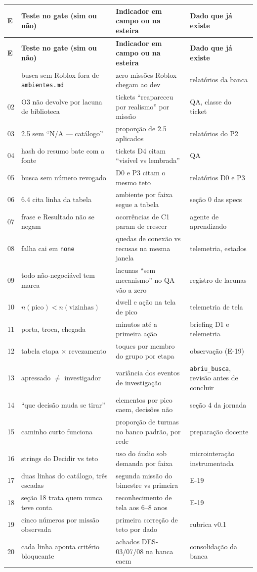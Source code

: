 \documentclass[11pt,a4paper]{article}
\begin{document}
\begin{longtable}{@{}p{0.9cm} p{4.6cm} p{4.6cm} p{4.4cm}@{}}
\toprule
\textbf{E} & \textbf{Teste no gate (sim ou não)} & \textbf{Indicador em campo ou na esteira} & \textbf{Dado que já existe} \\
\midrule
\endfirsthead
\toprule
\textbf{E} & \textbf{Teste no gate (sim ou não)} & \textbf{Indicador em campo ou na esteira} & \textbf{Dado que já existe} \\
\midrule
\endhead
\bottomrule
\endfoot
01 & busca sem Roblox fora de \texttt{ambientes.md} & zero missões Roblox chegam ao dev & relatórios da banca \\
02 & O3 não devolve por lacuna de biblioteca & tickets ``reapareceu por realismo'' por missão & QA, classe do ticket \\
03 & 2.5 sem ``N/A --- catálogo'' & proporção de 2.5 aplicados & relatórios do P2 \\
04 & hash do resumo bate com a fonte & tickets D4 citam ``visível vs lembrada'' & QA \\
05 & busca sem número revogado & D0 e P3 citam o mesmo teto & relatórios D0 e P3 \\
06 & 6.4 cita linha da tabela & ambiente por faixa segue a tabela & seção 0 das specs \\
07 & frase e Resultado não se negam & ocorrências de C1 param de crescer & agente de aprendizado \\
08 & falha cai em \texttt{none} & quedas de conexão vs recusas na mesma janela & telemetria, estados \\
09 & todo não-negociável tem marca & lacunas ``sem mecanismo'' no QA vão a zero & registro de lacunas \\
10 & $n(\text{pico}) < n(\text{vizinhas})$ & dwell e ação na tela de pico & telemetria de tela \\
11 & porta, troca, chegada & minutos até a primeira ação & briefing D1 e telemetria \\
12 & tabela etapa $\times$ revezamento & toques por membro do grupo por etapa & observação (E-19) \\
13 & apressado $\ne$ investigador & variância dos eventos de investigação & \texttt{abriu\_busca}, revisão antes de concluir \\
14 & ``que decisão muda se tirar'' & elementos por pico caem, decisões não & seção 4 da jornada \\
15 & caminho curto funciona & proporção de turmas no banco padrão, por rede & preparação docente \\
16 & strings do Decidir vs teto & uso do áudio sob demanda por faixa & microinteração instrumentada \\
17 & duas linhas do catálogo, três escadas & segunda missão do bimestre vs primeira & E-19 \\
18 & seção 18 trata quem nunca teve conta & reconhecimento de tela aos 6--8 anos & E-19 \\
19 & cinco números por missão observada & primeira correção de teto por dado & rubrica v0.1 \\
20 & cada linha aponta critério bloqueante & achados DES-03/07/08 na banca caem & consolidação da banca \\
\end{longtable}
\end{document}
